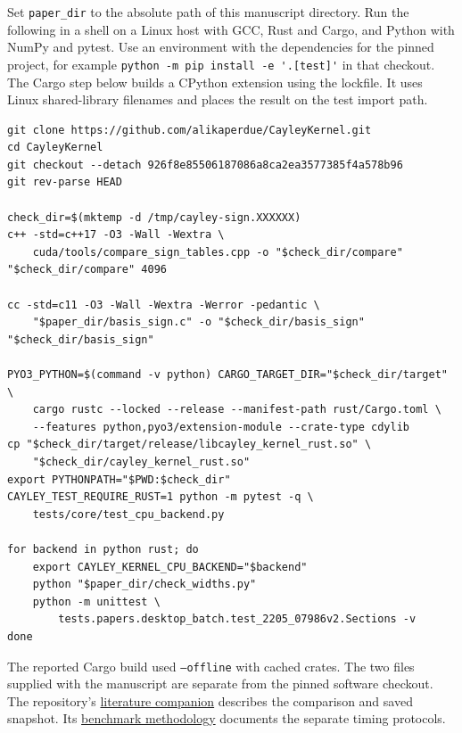 \documentclass[11pt]{article}
\begin{document}
Set \texttt{paper\_dir} to the absolute path of this manuscript
directory. Run the following in a shell on a Linux host with GCC,
Rust and Cargo, and Python with NumPy and pytest. Use an environment
with the dependencies for the pinned project, for example
\verb|python -m pip install -e '.[test]'| in that checkout.
The Cargo step below builds a CPython extension using the lockfile.
It uses Linux shared-library filenames and places the result on the
test import path.
\begin{lstlisting}
git clone https://github.com/alikaperdue/CayleyKernel.git
cd CayleyKernel
git checkout --detach 926f8e85506187086a8ca2ea3577385f4a578b96
git rev-parse HEAD

check_dir=$(mktemp -d /tmp/cayley-sign.XXXXXX)
c++ -std=c++17 -O3 -Wall -Wextra \
    cuda/tools/compare_sign_tables.cpp -o "$check_dir/compare"
"$check_dir/compare" 4096

cc -std=c11 -O3 -Wall -Wextra -Werror -pedantic \
    "$paper_dir/basis_sign.c" -o "$check_dir/basis_sign"
"$check_dir/basis_sign"

PYO3_PYTHON=$(command -v python) CARGO_TARGET_DIR="$check_dir/target" \
    cargo rustc --locked --release --manifest-path rust/Cargo.toml \
    --features python,pyo3/extension-module --crate-type cdylib
cp "$check_dir/target/release/libcayley_kernel_rust.so" \
    "$check_dir/cayley_kernel_rust.so"
export PYTHONPATH="$PWD:$check_dir"
CAYLEY_TEST_REQUIRE_RUST=1 python -m pytest -q \
    tests/core/test_cpu_backend.py

for backend in python rust; do
    export CAYLEY_KERNEL_CPU_BACKEND="$backend"
    python "$paper_dir/check_widths.py"
    python -m unittest \
        tests.papers.desktop_batch.test_2205_07986v2.Sections -v
done
\end{lstlisting}
The reported Cargo build used \texttt{--offline} with cached crates.
The two files supplied with the manuscript are separate from the pinned
software checkout. The repository's
\href{https://github.com/alikaperdue/CayleyKernel/blob/926f8e85506187086a8ca2ea3577385f4a578b96/docs/papers/2205.07986v2/README.md}{literature companion}
describes the comparison and saved snapshot. Its
\href{https://github.com/alikaperdue/CayleyKernel/blob/926f8e85506187086a8ca2ea3577385f4a578b96/docs/benchmark-methodology.md}{benchmark methodology}
documents the separate timing protocols.
\end{document}
